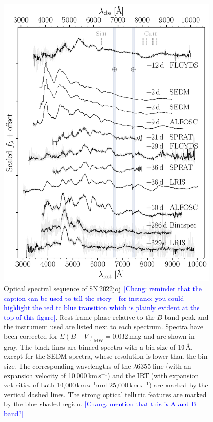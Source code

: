 \documentclass[twocolumn]{aastex631}
\newcommand{\sn}{SN\,2022joj}
\newcommand{\kms}{$\mathrm{km}\,\mathrm{s}^{-1}$}
\newcommand{\chang}[1]{\textcolor{blue}{[Chang: #1]}}
\begin{document}
\begin{CJK*}{UTF8}{gbsn}
\begin{figure}
    \centering
    \includegraphics[width=\linewidth]{SN2022joj_spectral_sequence.pdf}
    \caption{Optical spectral sequence of \sn\ \chang{reminder that the caption can be used to tell the story - for instance you could highlight the red to blue transition which is plainly evident at the top of this figure}. Rest-frame phase relative to the $B$-band peak and the instrument used are listed next to each spectrum. Spectra have been corrected for $E(B-V)_\mathrm{MW} = 0.032$\,mag and are shown in gray. The black lines are binned spectra with a bin size of 10\,\AA, except for the SEDM spectra, whose resolution is lower than the bin size. The corresponding wavelengths of the  $\lambda$6355 line (with an expansion velocity of 10,000\,\kms) and the  IRT (with expansion velocities of both 10,000\,\kms and 25,000\,\kms) are marked by the vertical dashed lines. The strong optical telluric features are marked by the blue shaded region. \chang{mention that this is A and B band?}}
    \label{fig:spec_seq}
\end{figure}


\end{CJK*}
\end{document}
